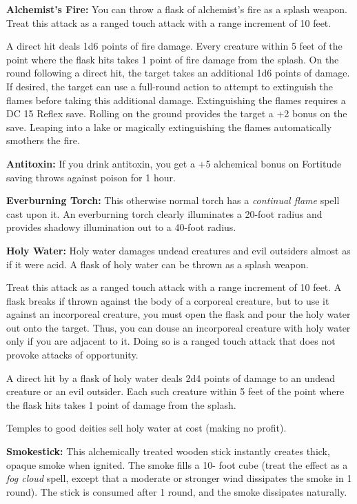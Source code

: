 \textbf{Alchemist's Fire:} You can throw a flask of alchemist's fire as a splash 
weapon. Treat this attack as a ranged touch attack with a range increment of 10 
feet.

A direct hit deals 1d6 points of fire damage. Every creature within 5 feet of the 
point where the flask hits takes 1 point of fire damage from the splash. On the 
round following a direct hit, the target takes an additional 1d6 points of damage. 
If desired, the target can use a full-round action to attempt to extinguish the 
flames before taking this additional damage. Extinguishing the flames requires 
a DC 15 Reflex save. Rolling on the ground provides the target a +2 bonus on the 
save. Leaping into a lake or magically extinguishing the flames automatically smothers 
the fire.

\textbf{Antitoxin:} If you drink antitoxin, you get a +5 alchemical bonus on Fortitude 
saving throws against poison for 1 hour.

\textbf{Everburning Torch:} This otherwise normal torch has a \textit{continual 
flame }spell cast upon it. An everburning torch clearly illuminates a 20-foot radius 
and provides shadowy illumination out to a 40-foot radius.

\textbf{Holy Water:} Holy water damages undead creatures and evil outsiders almost 
as if it were acid. A flask of holy water can be thrown as a splash weapon.

Treat this attack as a ranged touch attack with a range increment of 10 feet. A 
flask breaks if thrown against the body of a corporeal creature, but to use it 
against an incorporeal creature, you must open the flask and pour the holy water 
out onto the target. Thus, you can douse an incorporeal creature with holy water 
only if you are adjacent to it. Doing so is a ranged touch attack that does not 
provoke attacks of opportunity.

A direct hit by a flask of holy water deals 2d4 points of damage to an undead creature 
or an evil outsider. Each such creature within 5 feet of the point where the flask 
hits takes 1 point of damage from the splash.

Temples to good deities sell holy water at cost (making no profit).

\textbf{Smokestick:} This alchemically treated wooden stick instantly creates thick, 
opaque smoke when ignited. The smoke fills a 10- foot cube (treat the effect as 
a \textit{fog cloud }spell, except that a moderate or stronger wind dissipates 
the smoke in 1 round). The stick is consumed after 1 round, and the smoke dissipates 
naturally.

